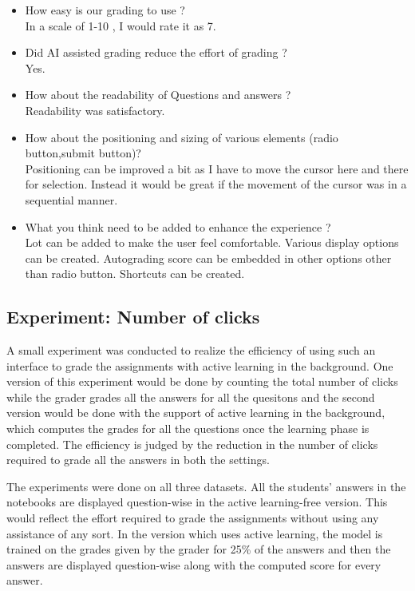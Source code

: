 	\begin{itemize}
		
		\item How easy is our grading to use ? \\
		In a scale of 1-10 , I would rate it as 7. 
		\item Did AI assisted grading reduce the effort of grading ? \\
		Yes. 
		\item How about the readability of Questions and answers ? \\
		Readability was satisfactory.
		\item How about the positioning and sizing of various elements (radio button,submit button)? \\
		Positioning can be improved a bit as I have to move the cursor here and there for selection. Instead it would be great if the movement of the cursor was in a sequential manner.
		\item What you think need to be added to enhance the experience ? \\
		Lot can be added to make the user feel comfortable. Various display options can be created. Autograding score can be embedded in other options other than radio button. Shortcuts can be created.
	\end{itemize}
	
	
	\subsection{Experiment: Number of clicks}
	
	A small experiment was conducted to realize the efficiency of using such an interface to grade the assignments with active learning in the background. One version of this experiment would be done by counting the total number of clicks while the grader grades all the answers for all the quesitons and the second version would be done with the support of active learning in the background, which computes the grades for all the questions once the learning phase is completed. The efficiency is judged by the reduction in the number of clicks required to grade all the answers in both the settings. 
	
	The experiments were done on all three datasets. All the students' answers in the notebooks are displayed question-wise in the active learning-free version. This would reflect the effort required to grade the assignments without using any assistance of any sort. In the version which uses active learning, the model is trained on the grades given by the grader for 25\% of the answers and then the answers are displayed question-wise along with the computed score for every answer. 
	
